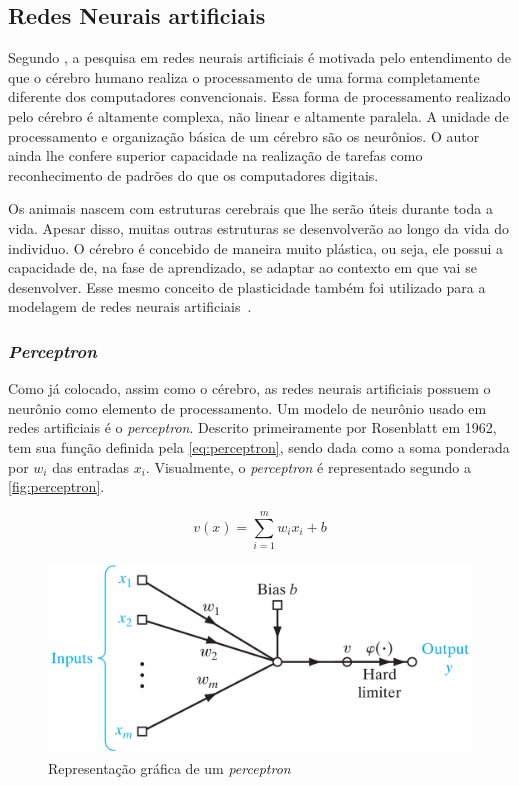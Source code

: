 \documentclass[
    12pt,
    oneside,
    a4paper,
    english,
    brazil
]{abntex2}
\begin{document}
\subsection{Redes Neurais artificiais}

Segundo  , a pesquisa  em  redes  neurais artificiais  é
motivada pelo entendimento de que o cérebro  humano realiza o processamento de uma
forma  completamente diferente  dos computadores  convencionais. Essa  forma de
processamento  realizado  pelo cérebro  é  altamente complexa,  não
linear e altamente paralela. A unidade de processamento e organização básica de
um cérebro são  os neurônios. O autor ainda lhe  confere superior capacidade na
realização de  tarefas como  reconhecimento de padrões  do que  os computadores
digitais.

Os animais nascem com estruturas cerebrais que lhe serão úteis durante toda a vida.  Apesar disso, muitas outras estruturas se desenvolverão ao longo da vida do individuo. O cérebro é concebido de maneira  muito plástica, ou seja, ele possui a capacidade de, na fase de aprendizado, se adaptar ao contexto em  que vai se desenvolver. Esse mesmo conceito de  plasticidade  também  foi  utilizado  para a  modelagem  de  redes  neurais
artificiais~\cite{haykin2009}.

\subsubsection{\textit{Perceptron}}

Como  já  colocado, assim como o cérebro, as  redes  neurais artificiais  possuem  o  neurônio como  elemento  de processamento. Um modelo de neurônio usado em redes artificiais é o \textit{perceptron}. Descrito  primeiramente por Rosenblatt em  1962,  tem sua  função definida  pela 
\autoref{eq:perceptron},  sendo  dada  como  a soma  ponderada  por  $w_i$  das
entradas $x_i$.  Visualmente, o  \textit{perceptron} é representado  segundo a
\autoref{fig:perceptron}.

\begin{equation}\label{eq:perceptron}
    v(x) = \sum_{i=1}^{m}{w_i  x_i + b}
\end{equation}

\begin{figure}[ht]
    \centering
    \caption{Representação gráfica de um \textit{perceptron}}\label{fig:perceptron}
    \includegraphics[width=.5\linewidth]{images/perceptron.png}
\end{figure}
\end{document}
